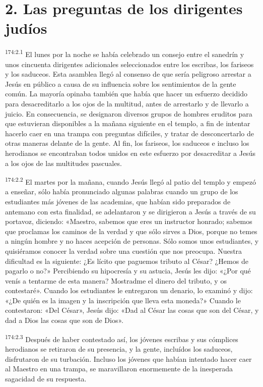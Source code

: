 \section*{2. Las preguntas de los dirigentes judíos}
\par 
\textsuperscript{174:2.1} El lunes por la noche se había celebrado un consejo entre el sanedrín y unos cincuenta dirigentes adicionales seleccionados entre los escribas, los fariseos y los saduceos. Esta asamblea llegó al consenso de que sería peligroso arrestar a Jesús en público a causa de su influencia sobre los sentimientos de la gente común. La mayoría opinaba también que había que hacer un esfuerzo decidido para desacreditarlo a los ojos de la multitud, antes de arrestarlo y de llevarlo a juicio. En consecuencia, se designaron diversos grupos de hombres eruditos para que estuvieran disponibles a la mañana siguiente en el templo, a fin de intentar hacerlo caer en una trampa con preguntas difíciles, y tratar de desconcertarlo de otras maneras delante de la gente. Al fin, los fariseos, los saduceos e incluso los herodianos se encontraban todos unidos en este esfuerzo por desacreditar a Jesús a los ojos de las multitudes pascuales.

\par 
\textsuperscript{174:2.2} El martes por la mañana, cuando Jesús llegó al patio del templo y empezó a enseñar, sólo había pronunciado algunas palabras cuando un grupo de los estudiantes más jóvenes de las academias, que habían sido preparados de antemano con esta finalidad, se adelantaron y se dirigieron a Jesús a través de su portavoz, diciendo: «Maestro, sabemos que eres un instructor honrado; sabemos que proclamas los caminos de la verdad y que sólo sirves a Dios, porque no temes a ningún hombre y no haces acepción de personas. Sólo somos unos estudiantes, y quisiéramos conocer la verdad sobre una cuestión que nos preocupa. Nuestra dificultad es la siguiente: ¿Es lícito que paguemos tributo al César? ¿Hemos de pagarlo o no?» Percibiendo su hipocresía y su astucia, Jesús les dijo: «¿Por qué venís a tentarme de esta manera? Mostradme el dinero del tributo, y os contestaré». Cuando los estudiantes le entregaron un denario, lo examinó y dijo: «¿De quién es la imagen y la inscripción que lleva esta moneda?» Cuando le contestaron: «Del César», Jesús dijo: «Dad al César las cosas que son del César, y dad a Dios las cosas que son de Dios».

\par 
\textsuperscript{174:2.3} Después de haber contestado así, los jóvenes escribas y sus cómplices herodianos se retiraron de su presencia, y la gente, incluídos los saduceos, disfrutaron de su turbación. Incluso los jóvenes que habían intentado hacer caer al Maestro en una trampa, se maravillaron enormemente de la inesperada sagacidad de su respuesta.

